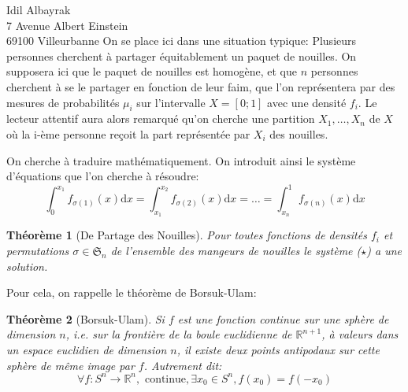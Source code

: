 \documentclass[french]{mpbmail}
\newtheorem{theorem}{Théorème}
\begin{document}
    \begin{letter}{%
        Idil Albayrak\\
        7 Avenue Albert Einstein\\
        69100 Villeurbanne
        }
        On se place ici dans une situation typique: Plusieurs personnes cherchent à partager équitablement un paquet de nouilles. 
        On supposera ici que le paquet de nouilles est homogène, et que $n$ personnes cherchent à se le partager en fonction de leur faim, que l'on représentera par des mesures de probabilités $\mu_{i}$ sur l'intervalle $X = \left[0 ; 1\right]$ avec une densité $f_{i}$. 
        Le lecteur attentif aura alors remarqué qu'on cherche une partition $X_{1}, \ldots, X_{n}$ de $X$ où la i-ème personne reçoit la part représentée par $X_{i}$ des nouilles.

        On cherche à traduire mathématiquement. On introduit ainsi le système d'équations que l'on cherche à résoudre: 
        \begin{equation*}\tag{$\star$}
            \int_{0}^{x_{1}}f_{\sigma(1)}(x) \mathrm{d}x = \int_{x_{1}}^{x_{2}}f_{\sigma(2)}(x)\mathrm{d}x = \ldots = \int_{x_{n}}^{1}f_{\sigma(n)}(x) \mathrm{d}x 
        \end{equation*}                        

        \begin{theorem}[De Partage des Nouilles]\label{thm:nouille-split}
            Pour toutes fonctions de densités $f_{i}$ et permutations $\sigma \in \mathfrak{S}_{n}$ de l'ensemble des mangeurs de nouilles le système ($\star$) a une solution. 
        \end{theorem}
        
        Pour cela, on rappelle le théorème de Borsuk-Ulam: 
        \begin{theorem}[Borsuk-Ulam]\label{thm:borsuk-ulam}
            Si $f$ est une fonction continue sur une sphère de dimension $n$, i.e. sur la frontière de la boule euclidienne de $\mathbb{R}^{n+1}$, à valeurs dans un espace euclidien de dimension $n$, il existe deux points antipodaux sur cette sphère de même image par $f$.
            Autrement dit: 
            \[\forall f: S^{n} \rightarrow \mathbb{R}^{n},\text{ continue}, \exists x_{0} \in S^{n}, f(x_{0}) = f(-x_{0})   \]
        \end{theorem}


\end{letter}
\end{document}

